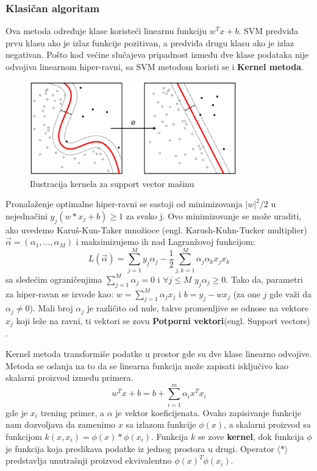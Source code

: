 \documentclass[12pt, letterpaper, oneside]{article}
\begin{document}
\subsubsection{Klasičan algoritam}
Ova metoda određuje klase koristeći linearnu funkciju $w^{T}x + b$. SVM predviđa prvu klasu ako je izlaz funkcije pozitivan, a predviđa drugu klasu ako je izlaz negativan.
Pošto kod većine slučajeva pripadnost između dve klase podataka nije odvojiva linearnom hiper-ravni, sa SVM metodom koristi se i \textbf{Kernel metoda}.

\begin{figure}[ht]
    \centering
    \includegraphics[width=0.8\textwidth]{files/512px-Kernel_Machine.png}
    \caption{Ilustracija kernela za support vector mašinu \cite{SvmImage}}
\end{figure}

Pronalaženje optimalne hiper-ravni se sastoji od minimizovanja $|w|^{2}/2$ u nejednačini $y_j(w*x_j+b) \geq 1$ za svako j. 
Ovo minimizovanje se može uraditi, ako uvedemo Karuš-Kun-Taker množioce (engl. Karush-Kuhn-Tucker multiplier) $\overrightarrow{\alpha} = (\alpha_1,...,\alpha_M)$ i maksimizujemo ih nad Lagranžovoj funkcijom:
\[
    L(\overrightarrow{\alpha}) = \sum_{j=1}^{M}{y_j\alpha_j} - \frac{1}{2}\sum_{j,k=1}^{M}{\alpha_j\alpha_kx_jx_k}
\]
sa sledećim ograničenjima $\sum_{j=1}^{M}{\alpha_j=0}$ i $\forall j \leq M $ $y_j\alpha_j \geq 0$. Tako da, parametri za hiper-ravan se izvode kao:
$w = \sum_{j=1}^{M}\alpha_jx_j$ i $b = y_j - wx_j$ (za one $j$ gde važi da $\alpha_j \neq 0$). Mali broj $\alpha_j$ je različito od nule, takve promenljive se odnose na vektore $x_j$ koji leže na ravni,
ti vektori se zovu \textbf{Potporni vektori}(engl. Support vectors) \cite{rebentrost2014quantum}.

Kernel metoda transformiše podatke u prostor gde su dve klase linearno odvojive. Metoda se oslanja na to da se linearna funkcija
može zapisati isključivo kao skalarni proizvod između primera.
\[
    w^{T}x + b = b + \sum_{i=1}^m \alpha_i x^T x_i
\]
gde je $x_i$ trening primer, a $\alpha$ je vektor koeficijenata. Ovako zapisivanje funkcije nam dozvoljava da zamenimo $x$ sa izlazom funkcije $\phi(x)$, a skalarni proizvod sa funkcijom $k(x,x_i) = \phi(x)*\phi(x_i)$.
Funkcija $k$ se zove \textbf{kernel}, dok funkcija $\phi$ je funkcija koja preslikava podatke iz jednog prostora u drugi. Operator $\langle * \rangle$ predstavlja unutrašnji proizvod ekvivalentno $\phi(x)^T\phi(x_i)$. \cite{goodfellow2016deep}
\end{document}

